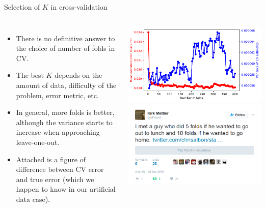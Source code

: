 \documentclass[10pt, aspectratio=169]{beamer} %
\begin{document}
\begin{frame}[fragile]{Selection of $K$ in cross-validation}
\begin{columns}
\begin{itemize}
\item There is no definitive answer to the choice of number of folds in CV.
\item The best $K$ depends on the amount of data, difficulty of the problem,
error metric, etc.
\item In general, more folds is better, although the variance starts to increase
when approaching leave-one-out.
\item Attached is a figure of difference between CV error and true error
(which we happen to know in our artificial data case).
\end{itemize}
\includegraphics[width=1.0\columnwidth]{K_scores_var.pdf}\\

\includegraphics[width=\columnwidth]{folds_tweet.png}
\end{columns}
\end{frame}
\end{document}
